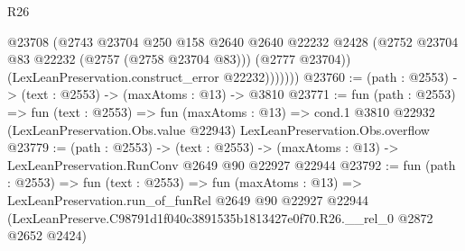 \begin{lexlean}{R26}
\begin{coremodule}
                @23708
                (@2743
                  @23704
                  @250
                  @158
                  @2640
                  @2640
                  @22232
                  @2428
                  (@2752 @23704 @83 @22232 (@2757 (@2758 @23704 @83)))
                  (@2777 @23704))
                (LexLeanPreservation.construct_error @22232)))))))
@23760 := (path : @2553) -> (text : @2553) -> (maxAtoms : @13) -> @3810
@23771 := fun (path : @2553) =>
  fun (text : @2553) =>
  fun (maxAtoms : @13) =>
  cond.{1} @3810 @22932 (LexLeanPreservation.Obs.value @22943) LexLeanPreservation.Obs.overflow
@23779 := (path : @2553) ->
  (text : @2553) -> (maxAtoms : @13) -> LexLeanPreservation.RunConv @2649 @90 @22927 @22944
@23792 := fun (path : @2553) =>
  fun (text : @2553) =>
  fun (maxAtoms : @13) =>
  LexLeanPreservation.run_of_funRel
    @2649
    @90
    @22927
    @22944
    (LexLeanPreserve.C98791d1f040c3891535b1813427e0f70.R26.__rel_0 @2872 @2652 @2424)
\end{coremodule}
\end{lexlean}

